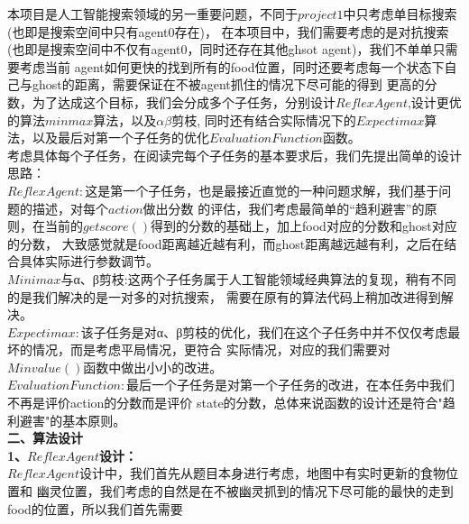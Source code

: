 \documentclass[a4paper,12pt,UTF8]{article}
\begin{document}
\begin{flushleft}
{{    }
    \normalsize{
        \hspace{1cm}本项目是人工智能搜索领域的另一重要问题，不同于$project1$中只考虑单目标搜索(也即是搜索空间中只有agent0存在)，
        在本项目中，我们需要考虑的是对抗搜索(也即是搜索空间中不仅有agent0，同时还存在其他ghsot agent)，我们不单单只需要考虑当前
        agent如何更快的找到所有的food位置，同时还要考虑每一个状态下自己与ghost的距离，需要保证在不被agent抓住的情况下尽可能的得到
        更高的分数，为了达成这个目标，我们会分成多个子任务，分别设计$Reflex Agent$,设计更优的算法$minmax$算法，以及$α β$剪枝,
        同时还有结合实际情况下的$Expectimax$算法，以及最后对第一个子任务的优化$Evaluation Function$函数。\\
        \hspace{1cm}考虑具体每个子任务，在阅读完每个子任务的基本要求后，我们先提出简单的设计思路：\\
        \hspace{1cm}$Reflex Agent:$这是第一个子任务，也是最接近直觉的一种问题求解，我们基于问题的描述，对每个$action$做出分数
        的评估，我们考虑最简单的“趋利避害”的原则，在当前的$getscore()$得到的分数的基础上，加上food对应的分数和ghost对应的分数，
        大致感觉就是food距离越近越有利，而ghost距离越远越有利，之后在结合具体实际进行参数调节。\\
        \hspace{1cm}$Minimax$与α、β剪枝:这两个子任务属于人工智能领域经典算法的复现，稍有不同的是我们解决的是一对多的对抗搜索，
        需要在原有的算法代码上稍加改进得到解决。\\
        \hspace{1cm}$Expectimax:$该子任务是对α、β剪枝的优化，我们在这个子任务中并不仅仅考虑最坏的情况，而是考虑平局情况，更符合
        实际情况，对应的我们需要对$Minvalue()$函数中做出小小的改进。\\
        \hspace{1cm}$Evaluation Function:$最后一个子任务是对第一个子任务的改进，在本任务中我们不再是评价action的分数而是评价
        state的分数，总体来说函数的设计还是符合"趋利避害"的基本原则。\\
    }
    \Large{
        \textbf{
            二、算法设计\\
        }
    }
    \large{
        \hspace{1cm}\textbf{1、$Reflex Agent$设计：\\}
    }
    \normalsize{
        \hspace{1cm}$Reflex Agent$设计中，我们首先从题目本身进行考虑，地图中有实时更新的食物位置和
        幽灵位置，我们考虑的自然是在不被幽灵抓到的情况下尽可能的最快的走到food的位置，所以我们首先需要
}}
\end{flushleft}
\end{document}
